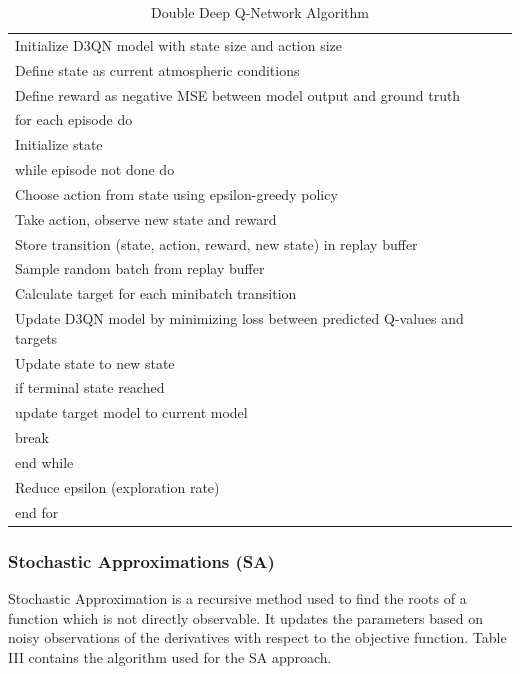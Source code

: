\documentclass[conference]{IEEEtran}
\begin{document}
\begin{table}[ht]
\centering
\begin{tabular}{l}
Initialize D3QN model with state size and action size\\
Define state as current atmospheric conditions\\
Define reward as negative MSE between model output and ground truth\\[6pt]
for each episode do\\
\quad Initialize state\\
\quad while episode not done do\\
\quad\quad Choose action from state using epsilon-greedy policy\\
\quad\quad Take action, observe new state and reward\\
\quad\quad Store transition (state, action, reward, new state) in replay buffer\\
\quad\quad Sample random batch from replay buffer\\
\quad\quad Calculate target for each minibatch transition\\
\quad\quad Update D3QN model by minimizing loss between predicted Q-values and targets\\
\quad\quad Update state to new state\\
\quad\quad if terminal state reached\\
\quad\quad\quad update target model to current model\\
\quad\quad\quad break\\
\quad end while\\
\quad Reduce epsilon (exploration rate)\\
end for\\
\end{tabular}
\caption{Double Deep Q-Network Algorithm}
\label{alg:d3qn}
\end{table}

\subsubsection{Stochastic Approximations (SA)}
Stochastic Approximation is a recursive method used to find the roots of a function which is not directly observable. It updates the parameters based on noisy observations of the derivatives with respect to the objective function. Table III contains the algorithm used for the SA approach.
\end{document}
